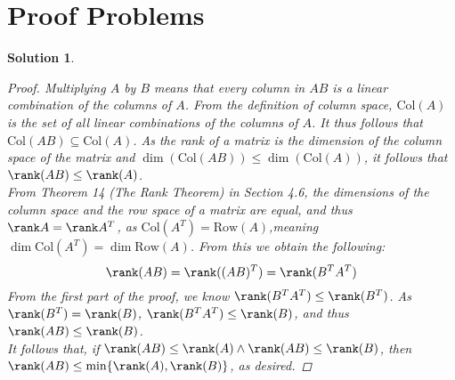 \documentclass[11pt]{scrartcl}
\theoremstyle{dotlessP}
\newtheorem{sol}{Solution}[section]
\theoremstyle{dotlessN}
\DeclarePairedDelimiter\set{\{}{\}}
\newcommand{\col}{\text{Col}}
\newcommand{\row}{\text{Row}}
\begin{document}
\section{Proof Problems}
\begin{sol}
	\begin{proof}
		Multiplying $A$ by $B$ means that every column in $AB$ is a linear combination of the columns of $A$. From the definition of column space, $\col(A)$ is the set of all linear combinations of the columns of $A$. It thus follows that $\col(AB) \subseteq \col(A)$. As the rank of a matrix is the dimension of the column space of the matrix and $\dim(\col(AB)) \leq \dim(\col(A))$, it follows that $\rank(AB) \leq \rank(A)$.
		\\

		 From Theorem 14 (The Rank Theorem) in Section 4.6, the dimensions of the column space and the row space of a matrix are equal, and thus $\rank A = \rank A^T$, as $\col(A^T) = \row(A)$,meaning $\dim\col(A^T) = \dim\row(A)$. From this we obtain the following:
		 \[
		 \rank(AB) = \rank((AB)^T) = \rank(B^TA^T)
		 \] 
		 From the first part of the proof, we know $\rank(B^TA^T) \leq \rank(B^T)$. As  $\rank(B^T) = \rank(B)$, $\rank(B^TA^T) \leq \rank (B)$, and thus  $\rank(AB) \leq \rank(B)$.
		 \\

		 It follows that, if $\rank(AB) \leq \rank(A) \land \rank(AB) \leq \rank(B)$, then $\rank(AB) \leq \min\set*{\rank(A), \rank(B)}$, as desired.
	\end{proof}
\end{sol}
\end{document}
